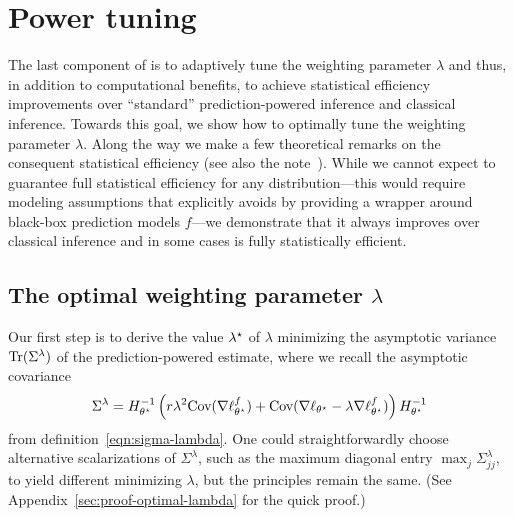 
\section{Power tuning}
\label{sec:setting-lambda}

The last component of \ppipp is to adaptively tune the weighting parameter
$\lambda$ and thus, in addition to computational benefits, to achieve
statistical efficiency improvements over ``standard'' prediction-powered
inference and classical inference.
Towards this goal, we show how to optimally tune the weighting parameter
$\lambda$.
%
Along the way we make a few theoretical remarks
on the consequent statistical efficiency (see also the
note~\cite{AngelopoulosDuZr23w}).
%
While we cannot expect \ppipp to guarantee
full statistical efficiency for any distribution---this would require
modeling assumptions that
\ppipp explicitly avoids by providing a wrapper around black-box
prediction models $f$---we demonstrate
that it always improves over classical inference and in some cases is
fully statistically efficient.

\subsection{The optimal weighting parameter $\lambda$}

Our first step is to derive the value $\lambda^\star$ of $\lambda$ minimizing
the asymptotic variance $\mathrm{Tr} (\Sigma^\lambda)$ of the prediction-powered
estimate, where we recall the asymptotic covariance
\begin{equation*}
  \Sigma^\lambda
  = H_{\theta^\star}^{-1}
  \left(r \lambda^2 \textup{Cov}(\nabla \ell_{\theta^\star}^f)
  + \textup{Cov}(\nabla \ell_{\theta^\star} - \lambda \nabla \ell_{\theta^\star}^f)
  \right) H_{\theta^\star}^{-1}
\end{equation*}
from definition~\eqref{eqn:sigma-lambda}. One could straightforwardly choose
alternative scalarizations of $\Sigma^\lambda$, such as the maximum diagonal
entry $\max_j \Sigma_{jj}^\lambda$, to yield different minimizing
$\lambda$, but the principles remain the same.
(See Appendix~\ref{sec:proof-optimal-lambda} for the quick proof.)


